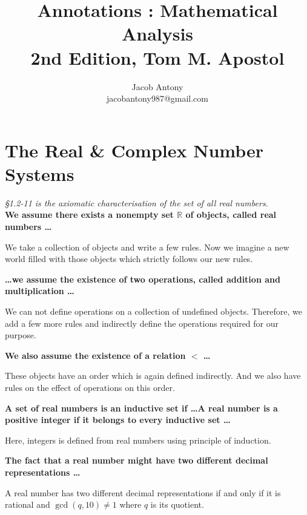 \documentclass[a4paper,12pt,openany]{book}
\title{Annotations : Mathematical Analysis\\ 2nd Edition, Tom M. Apostol}
\author{Jacob Antony\\jacobantony987@gmail.com}
\begin{document}
\maketitle
\chapter{The Real \& Complex Number Systems}
\textit{\S1.2-11 is the axiomatic characterisation of the set of all real numbers.}\\

\textbf{\phantom{}}
\textbf{We assume there exists a nonempty set $\mathbb{R}$ of objects, called real numbers \dots}\\
\begin{story}
	We take a collection of objects and write a few rules.
	Now we imagine a new world filled with those objects which strictly follows our new rules.
\end{story}

\textbf{\phantom{}}
\textbf{\dots we assume the existence of two operations, called addition and multiplication \dots}\\
\begin{story}
	We can not define operations on a collection of undefined objects.
	Therefore, we add a few more rules and indirectly define the operations required for our purpose.
\end{story}

\textbf{\phantom{}}
\textbf{We also assume the existence of a relation $<$ \dots}\\
\begin{story}
	These objects have an order which is again defined indirectly.
	And we also have rules on the effect of operations on this order.
\end{story}

\textbf{\phantom{}}
\textbf{A set of real numbers is an inductive set if \dots A real number is a positive integer if it belongs to every inductive set \dots}\\
\begin{story}
	Here, integers is defined from real numbers using principle of induction.
\end{story}

\textbf{\phantom{}}
\textbf{The fact that a real number might have two different decimal representations \dots}\\
\begin{doubt}
	A real number has two different decimal representations if and only if it is rational and $\gcd(q,10) \ne 1$ where $q$ is its quotient.
\end{doubt}
\end{document}
